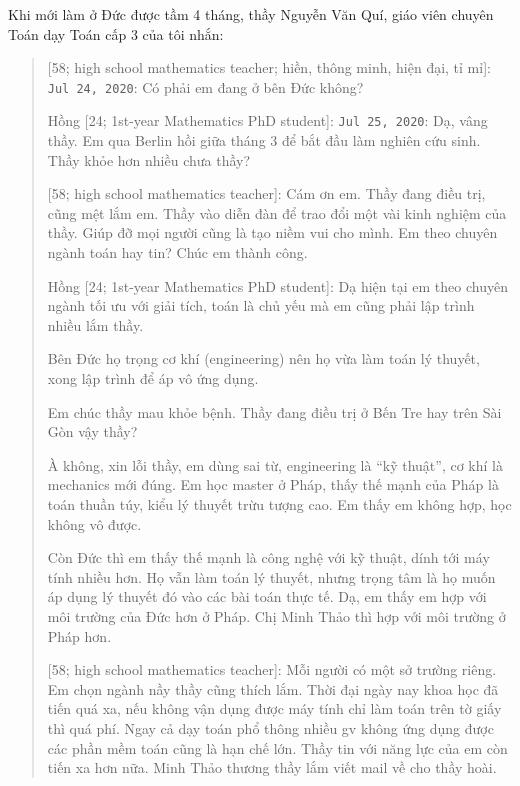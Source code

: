 \documentclass[12pt,twoside]{book}
\begin{document}
\begin{flushright}
	\musEighth[\href{https://www.youtube.com/watch?v=dIbeazAlxM4}{\small{\sc Chopin} {\it Ballade No. 1 in G Minor}}]\musEighth
\end{flushright}
Khi mới làm ở Đức được tầm 4 tháng, thầy {\sc Nguyễn Văn Quí}, giáo viên chuyên Toán dạy Toán cấp 3 của tôi nhắn:
\begin{quote}
	{ [58; high school mathematics teacher; hiền, thông minh, hiện đại, tỉ mỉ]}: {\tt Jul 24, 2020}: Có phải em đang ở bên Đức không?
	
	{\sf Hồng [24; 1st-year Mathematics PhD student]}: {\tt Jul 25, 2020}: Dạ, vâng thầy. Em qua Berlin hồi giữa tháng 3 để bắt đầu làm nghiên cứu sinh. Thầy khỏe hơn nhiều chưa thầy?
	
	{ [58; high school mathematics teacher]}: Cám ơn em. Thầy đang điều trị, cũng mệt lắm em. Thầy vào diễn đàn để trao đổi một vài kinh nghiệm của thầy. Giúp đỡ mọi người cũng là tạo niềm vui cho mình. Em theo chuyên ngành toán hay tin? Chúc em thành công.
	
	{\sf Hồng [24; 1st-year Mathematics PhD student]}: Dạ hiện tại em theo chuyên ngành tối ưu với giải tích, toán là chủ yếu mà em cũng phải lập trình nhiều lắm thầy.
	
	Bên Đức họ trọng cơ khí (engineering) nên họ vừa làm toán lý thuyết, xong lập trình để áp vô ứng dụng.
	
	Em chúc thầy mau khỏe bệnh. Thầy đang điều trị ở Bến Tre hay trên Sài Gòn vậy thầy?
	
	À không, xin lỗi thầy, em dùng sai từ, engineering là ``kỹ thuật'', cơ khí là mechanics mới đúng. Em học master ở Pháp, thấy thế mạnh của Pháp là toán thuần túy, kiểu lý thuyết trừu tượng cao. Em thấy em không hợp, học không vô được.
	
	Còn Đức thì em thấy thế mạnh là công nghệ với kỹ thuật, dính tới máy tính nhiều hơn. Họ vẫn làm toán lý thuyết, nhưng trọng tâm là họ muốn áp dụng lý thuyết đó vào các bài toán thực tế. Dạ, em thấy em hợp với môi trường của Đức hơn ở Pháp. Chị {\sc Minh Thảo} thì hợp với môi trường ở Pháp hơn.
	
	{ [58; high school mathematics teacher]}: Mỗi người có một sở trường riêng. Em chọn ngành nầy thầy cũng thích lắm. Thời đại ngày nay khoa học đã tiến quá xa, nếu không vận dụng được máy tính chỉ làm toán trên tờ giấy thì quá phí. Ngay cả dạy toán phổ thông nhiều gv không ứng dụng được các phần mềm toán cũng là hạn chế lớn. Thầy tin với năng lực của em còn tiến xa hơn nữa. {\sc Minh Thảo} thương thầy lắm viết mail về cho thầy hoài.
	

\end{quote}
\end{document}
